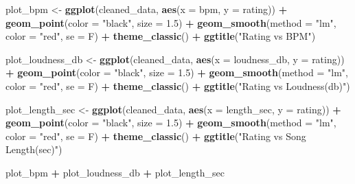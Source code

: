 \documentclass[
]{article}
\newenvironment{Shaded}{\begin{snugshade}}{\end{snugshade}}
\newcommand{\AttributeTok}[1]{\textcolor[rgb]{0.13,0.29,0.53}{#1}}
\newcommand{\FloatTok}[1]{\textcolor[rgb]{0.00,0.00,0.81}{#1}}
\newcommand{\FunctionTok}[1]{\textcolor[rgb]{0.13,0.29,0.53}{\textbf{#1}}}
\newcommand{\NormalTok}[1]{#1}
\newcommand{\OtherTok}[1]{\textcolor[rgb]{0.56,0.35,0.01}{#1}}
\newcommand{\SpecialCharTok}[1]{\textcolor[rgb]{0.81,0.36,0.00}{\textbf{#1}}}
\newcommand{\StringTok}[1]{\textcolor[rgb]{0.31,0.60,0.02}{#1}}
\begin{document}
\begin{Shaded}
\begin{Highlighting}[]
\NormalTok{plot\_bpm }\OtherTok{\textless{}{-}} \FunctionTok{ggplot}\NormalTok{(cleaned\_data, }\FunctionTok{aes}\NormalTok{(}\AttributeTok{x =}\NormalTok{ bpm, }\AttributeTok{y =}\NormalTok{ rating)) }\SpecialCharTok{+}
  \FunctionTok{geom\_point}\NormalTok{(}\AttributeTok{color =} \StringTok{"black"}\NormalTok{, }\AttributeTok{size =} \FloatTok{1.5}\NormalTok{) }\SpecialCharTok{+}
  \FunctionTok{geom\_smooth}\NormalTok{(}\AttributeTok{method =} \StringTok{"lm"}\NormalTok{, }\AttributeTok{color =} \StringTok{"red"}\NormalTok{, }\AttributeTok{se =}\NormalTok{ F) }\SpecialCharTok{+}
  \FunctionTok{theme\_classic}\NormalTok{() }\SpecialCharTok{+}
  \FunctionTok{ggtitle}\NormalTok{(}\StringTok{"Rating vs BPM"}\NormalTok{)}

\NormalTok{plot\_loudness\_db }\OtherTok{\textless{}{-}} \FunctionTok{ggplot}\NormalTok{(cleaned\_data, }\FunctionTok{aes}\NormalTok{(}\AttributeTok{x =}\NormalTok{ loudness\_db, }\AttributeTok{y =}\NormalTok{ rating)) }\SpecialCharTok{+}
  \FunctionTok{geom\_point}\NormalTok{(}\AttributeTok{color =} \StringTok{"black"}\NormalTok{, }\AttributeTok{size =} \FloatTok{1.5}\NormalTok{) }\SpecialCharTok{+}
  \FunctionTok{geom\_smooth}\NormalTok{(}\AttributeTok{method =} \StringTok{"lm"}\NormalTok{, }\AttributeTok{color =} \StringTok{"red"}\NormalTok{, }\AttributeTok{se =}\NormalTok{ F) }\SpecialCharTok{+}
  \FunctionTok{theme\_classic}\NormalTok{() }\SpecialCharTok{+}
  \FunctionTok{ggtitle}\NormalTok{(}\StringTok{"Rating vs Loudness(db)"}\NormalTok{)}

\NormalTok{plot\_length\_sec }\OtherTok{\textless{}{-}} \FunctionTok{ggplot}\NormalTok{(cleaned\_data, }\FunctionTok{aes}\NormalTok{(}\AttributeTok{x =}\NormalTok{ length\_sec, }\AttributeTok{y =}\NormalTok{ rating)) }\SpecialCharTok{+}
  \FunctionTok{geom\_point}\NormalTok{(}\AttributeTok{color =} \StringTok{"black"}\NormalTok{, }\AttributeTok{size =} \FloatTok{1.5}\NormalTok{) }\SpecialCharTok{+}
  \FunctionTok{geom\_smooth}\NormalTok{(}\AttributeTok{method =} \StringTok{"lm"}\NormalTok{, }\AttributeTok{color =} \StringTok{"red"}\NormalTok{, }\AttributeTok{se =}\NormalTok{ F) }\SpecialCharTok{+}
  \FunctionTok{theme\_classic}\NormalTok{() }\SpecialCharTok{+}
  \FunctionTok{ggtitle}\NormalTok{(}\StringTok{"Rating vs Song Length(sec)"}\NormalTok{)}

\NormalTok{plot\_bpm }\SpecialCharTok{+}\NormalTok{ plot\_loudness\_db }\SpecialCharTok{+}\NormalTok{ plot\_length\_sec}
\end{Highlighting}
\end{Shaded}
\end{document}
